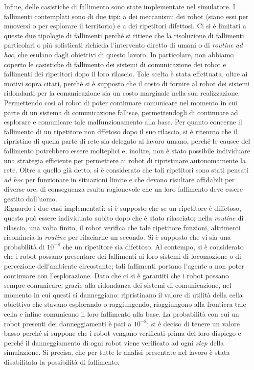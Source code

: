 Infine,  delle casistiche di fallimento sono state implementate nel simulatore.
I fallimenti contemplati sono di due tipi: a dei meccanismi dei robot (siano essi per muoversi o per esplorare il territorio) e a dei ripetitori difettosi.
Ci si è limitati a queste due tipologie di fallimenti perché si ritiene che la risoluzione di fallimenti particolari o più sofisticati richieda l'intervento diretto di umani o di \textit{routine ad hoc}, che esulano dagli obiettivi di questo lavoro.
In particolare, non abbiamo coperto le casistiche di fallimento dei sistemi di comunicazione dei robot e fallimenti dei ripetitori dopo il loro rilascio.
Tale scelta è stata effettuata, oltre ai motivi sopra citati, perché si è supposto che il costo di fornire al robot dei sistemi ridondanti per la comunicazione sia un costo marginale nella sua realizzazione. 
Permettendo così al robot di poter continuare comunicare nel momento in cui parte di un sistema di comunicazione fallisce, permettendogli di continuare ad esplorare e comunicare tale malfunzionamento alla base.
Per quanto concerne il fallimento di un ripetitore non dffetoso dopo il suo rilascio, si è ritenuto che il ripristino di quella parte di rete sia delegato al lavoro umano, perché le causee del fallimento potrebbero essere molteplici e, inoltre, non è stato possibile individuare una strategia efficiente per permettere ai robot di ripristinare autonomamente la rete.
Oltre a quello già detto, si è considerato che tali ripetitori sono stati pensati \textit{ad hoc} per funzionare in situazioni limite e che devono risultare affidabili \cite{OWL} per diverse ore, di conseguenza rsulta ragionevole che un loro fallimento deve essere gestito dall'uomo.\\
Riguardo i due casi implementati: si è supposto che se un ripetitore è diffetoso, questo può essere individuato subito dopo che è stato rilasciato; nella \textit{routine} di rilascio, una volta finito, il robot verifica che tale ripetitore funzioni, altrimenti ricomincia la \textit{routine} per rilaciarne un secondo.
Si è supposto che vi sia una probabilità di $10^{-8}$ che un ripetitore sia difettoso.
Al contempo, si è considerato che i robot possano presentare dei fallimenti ai loro sistemi di locomozione o di percezione dell'ambiente circostante; tali fallimenti portano l'agente a non poter continuare con l'esplorazione.
Dato che ci si è garantiti che i robot possano sempre comunicare, grazie alla ridondanza dei sistemi di comunicazione, nel momento in cui questi si danneggiano: ripristinano il valore di utilità della cella obiettivo che stavano esplorando o raggiungendo, riaggiungono alla frontiera tale cella e infine comunicano il loro fallimento alla base.
La probabilità con cui un robot presenti dei danneggiamenti è pari a $10^{-8}$; si è deciso di tenere un valore basso perché si suppone che i robot vengano verificati prima del loro dispiego e perché il danneggiamento di ogni robot viene verificato ad ogni \textit{step} della simulazione.
Si precisa, che per tutte le analisi presentate nel lavoro è stata disabilitata la possibilità di fallimento.

